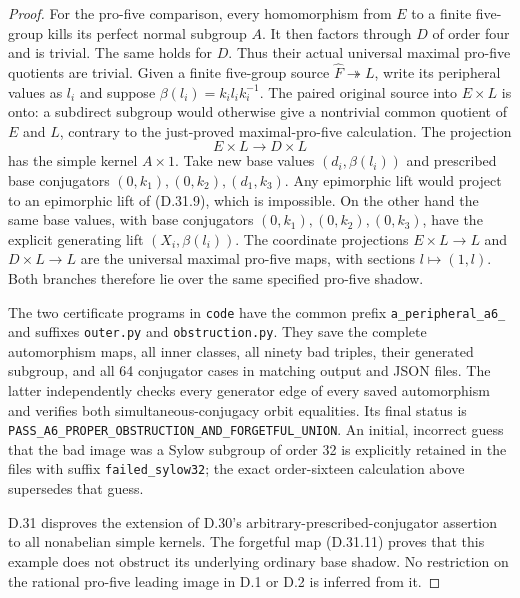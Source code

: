 \begin{proof}
For the pro-five comparison, every
homomorphism from $E$ to a finite
five-group kills its perfect normal
subgroup $A$.  It then factors
through $D$ of order four and is
trivial.  The same holds for $D$.
Thus their actual universal maximal
pro-five quotients are trivial.
Given a finite five-group source
$\widehat F\twoheadrightarrow L$,
write its peripheral values as
$l_i$ and suppose
$\beta(l_i)=k_i l_i k_i^{-1}$.
The paired original source into
$E\times L$ is onto: a subdirect
subgroup would otherwise give a
nontrivial common quotient of $E$
and $L$, contrary to the just-proved
maximal-pro-five calculation.
The projection
\[
 E\times L\longrightarrow D\times L
 \tag{D.31.12}
\]
has the simple kernel $A\times1$.
Take new base values
$(d_i,\beta(l_i))$ and prescribed
base conjugators
$(0,k_1),(0,k_2),(d_1,k_3)$.
Any epimorphic lift would project
to an epimorphic lift of
\textup{(D.31.9)}, which is impossible.
On the other hand the same base
values, with base conjugators
$(0,k_1),(0,k_2),(0,k_3)$, have the
explicit generating lift
$(X_i,\beta(l_i))$.
The coordinate projections
$E\times L\to L$ and $D\times L\to L$
are the universal maximal pro-five
maps, with sections $l\mapsto(1,l)$.
Both branches therefore lie over
the same specified pro-five shadow.

The two certificate programs in \texttt{code}
have the common prefix \texttt{a\_peripheral\_a6\_}
and suffixes \texttt{outer.py} and \texttt{obstruction.py}.
They save the complete automorphism maps,
all inner classes, all ninety bad
triples, their generated subgroup,
and all 64 conjugator cases in
matching output and JSON files.
The latter independently checks every
generator edge of every saved
automorphism and verifies both
simultaneous-conjugacy orbit equalities.
Its final status is
\texttt{PASS\_A6\_PROPER\_OBSTRUCTION\_AND\_FORGETFUL\_UNION}.
An initial, incorrect guess that the
bad image was a Sylow subgroup of
order 32 is explicitly retained in
the files with suffix
\texttt{failed\_sylow32}; the exact
order-sixteen calculation above
supersedes that guess.

D.31 disproves the extension of
D.30's arbitrary-prescribed-conjugator
assertion to all nonabelian simple
kernels.  The forgetful map
\textup{(D.31.11)} proves that this
example does not obstruct its
underlying ordinary base shadow.
No restriction on the rational
pro-five leading image in D.1 or
D.2 is inferred from it.
\end{proof}
